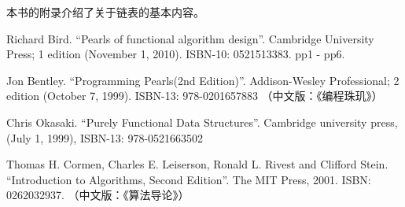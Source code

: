 \documentclass{article}
\begin{document}
本书的附录介绍了关于链表的基本内容。

\ifx\wholebook\relax \else
\begin{thebibliography}{99}

Richard Bird. ``Pearls of functional algorithm design''. Cambridge University Press; 1 edition (November 1, 2010). ISBN-10: 0521513383. pp1 - pp6.

Jon Bentley. ``Programming Pearls(2nd Edition)''. Addison-Wesley Professional; 2 edition (October 7, 1999). ISBN-13: 978-0201657883 （中文版：《编程珠玑》）

Chris Okasaki. ``Purely Functional Data Structures''. Cambridge university press, (July 1, 1999), ISBN-13: 978-0521663502

Thomas H. Cormen, Charles E. Leiserson, Ronald L. Rivest and Clifford Stein. ``Introduction to Algorithms, Second Edition''. The MIT Press, 2001. ISBN: 0262032937. （中文版：《算法导论》）

\end{thebibliography}

\expandafter\enddocument

\fi
\end{document}
